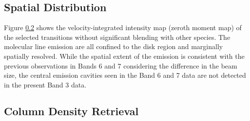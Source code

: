 \documentclass[linenumbers, twocolumn, times]{aastex631}
\newcommand{\methanol}{CH$_3$OH\xspace}
\newcommand{\acetaldehyde}{CH$_3$CHO\xspace}
\newcommand{\methylformate}{CH$_3$OCHO\xspace}
\begin{document}


\subsection{Spatial Distribution}
Figure \ref{} shows the velocity-integrated intensity map (zeroth moment map) of the selected transitions without significant blending with other species. The molecular line emission are all confined to the disk region and marginally spatially resolved. While the spatial extent of the emission is consistent with the previous observations in Bands 6 and 7 \citep{vantHoff2018, Lee2019, Tobin2023} considering the difference in the beam size, the central emission cavities seen in the Band 6 and 7 data are not detected in the present Band 3 data. 


\subsection{Column Density Retrieval}
\end{document}
